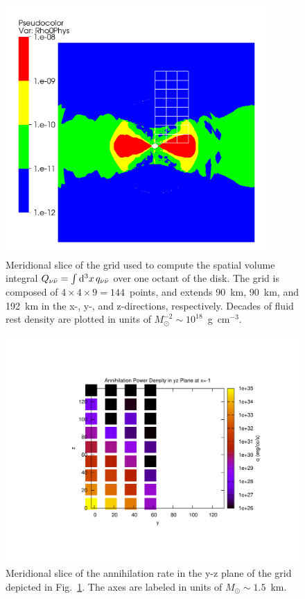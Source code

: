 \begin{figure}
  \centering
  \includegraphics[width=10cm]{Figures/annihilation-slice}
  \caption[Grid used for the volume integral of $q_{\nu\bar{\nu}}$]{
    Meridional slice of the grid used to compute the spatial volume
    integral $Q_{\nu\bar{\nu}}=\int\mathrm{d}^3 x\,q_{\nu\bar{\nu}}$ over one octant
    of the disk. The grid is composed of $4\times4\times9=144$~points,
    and extends 90~km, 90~km, and 192~km in the x-, y-, and z-directions,
    respectively.
    Decades of fluid rest density are plotted in units of
    $M_\odot^{-2}\sim10^{18}$~g~cm$^{-3}$.
  }
  \label{fig:q_grid}
\end{figure}

\begin{figure}
  \centering
  \includegraphics[width=13cm]{Figures/annihilation_rate_x-1}
  \caption[$q_{\nu\bar{\nu}}$ at the grid points]{
    Meridional slice of the annihilation rate in the y-z plane of the grid
    depicted in Fig.~\ref{fig:q_grid}. The axes are labeled in units of
    $M_\odot\sim1.5$~km.
  }
  \label{fig:q_rate_meridional}
\end{figure}

